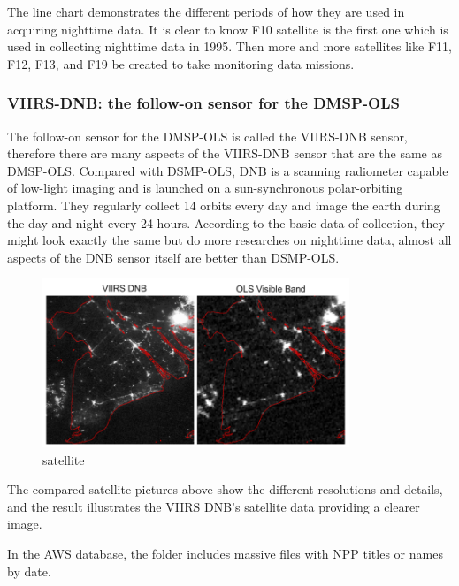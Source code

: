 \documentclass[conference]{IEEEtran}
\begin{document}
	The line chart demonstrates the different periods of how they are used in acquiring nighttime data.  It is clear to know F10 satellite 
	is the first one which is used in collecting nighttime data in 1995. Then more and more satellites like F11, F12, F13, and F19 be created 
	to take monitoring data missions.

\subsubsection{VIIRS-DNB: the follow-on sensor for the DMSP-OLS}

The follow-on sensor for the DMSP-OLS is called the VIIRS-DNB sensor, therefore there are many aspects of the VIIRS-DNB sensor that 
are the same as DMSP-OLS. Compared with DSMP-OLS, DNB is a scanning radiometer capable of low-light imaging and is launched on a sun-synchronous 
polar-orbiting platform. They regularly collect 14 orbits every day and image the earth during the day and night every 24 hours. According to 
the basic data of collection, they might look exactly the same but do more researches on nighttime data, almost all aspects of the DNB sensor 
itself are better than DSMP-OLS.

\begin{figure}[htbp]
\centerline{\includegraphics[width=260pt]{images/3.png}}
\caption{satellite}
\label{satellite1}
\end{figure}

The compared satellite pictures above show the different resolutions and details, and the result illustrates the VIIRS DNB's satellite 
data providing a clearer image.

In the AWS database, the folder includes massive files with NPP titles or names by date. 
\end{document}
